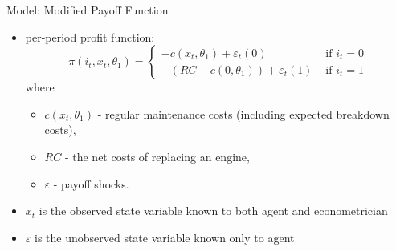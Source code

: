 \documentclass[xcolor=pdftex,dvipsnames,table,mathserif]{beamer}
\begin{document}
\begin{frame}{Model: Modified Payoff Function}
\begin{itemize}
	\item per-period profit function:\[
		\pi \left(i_{t},x_{t},\theta_{1}\right)=
		\begin{cases}
		-c\left(x_{t},\theta_{1}\right)+\varepsilon_{t}\left(0\right) & \mbox{ if }i_{t}=0\\		
		-\left(RC-c\left(0,\theta_{1}\right)\right)+\varepsilon_{t}\left(1\right) & \mbox{ if }i_{t}=1
		\end{cases}
		\]
	where \\
	\begin{itemize}
		\item $c\left(x_{t},\theta_{1}\right) $ -  regular maintenance costs (including expected breakdown costs),
		\item $RC$ - the net costs of replacing an engine,
		\item $\varepsilon$ - payoff shocks.
	\end{itemize}
	
	\item $x_{t}$ is the \alert{observed state variable} known to both agent and econometrician
	\item $\varepsilon$ is the \alert{unobserved state variable} known only to agent
\end{itemize}
\end{frame}
\end{document}
